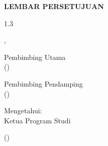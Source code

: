 
\newpage
{}
\begin{center}
	\textbf{\large \MakeUppercase{lembar persetujuan {\tipe}}}
\end{center}

\begin{doublespace}
\end{doublespace}

\vspace{\baselineskip}

\begin{center}

	\begin{spacing}{1.3}
		\textbf{\large \MakeUppercase{\judulidtabbed}}
	\end{spacing}
	\vspace{1.5cm}
\end{center}

\vspace{-\baselineskip}

\begin{flushright}
	{\kota}, {\tglpersetujuan}
\end{flushright}

\vspace{\baselineskip}

\begin{center}
	\begin{minipage}{0.45\textwidth}
		\begin{center}
			Pembimbing Utama\\[3cm]
			({\pembimbingutama})\\
		\end{center}
	\end{minipage}
	\hfill
	\begin{minipage}{0.45\textwidth}
		\begin{center}
			Pembimbing Pendamping\\[3cm]
			({\pembimbingpendamping})\\
		\end{center}
	\end{minipage}
\end{center}

\vspace{\baselineskip}

\begin{center}
	\begin{doublespace}
		Mengetahui:\\
		Ketua Program Studi \textbf{{\prodi}}\\[3cm]
	\end{doublespace}
	({\kaprodi})\\
\end{center}
